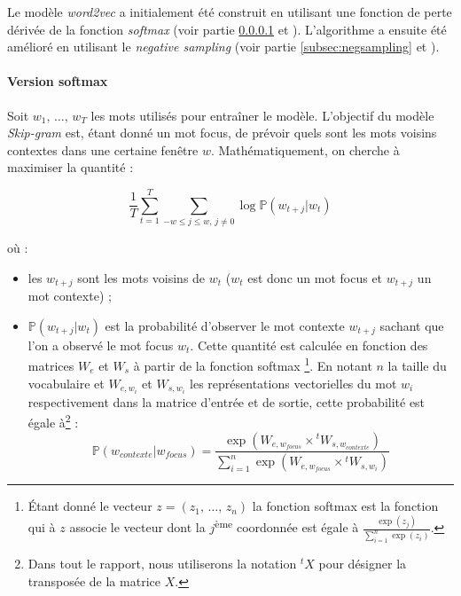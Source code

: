 \documentclass[11pt,french,french]{article}
\let\rmarkdownfootnote\footnote%
\def\footnote{\protect\rmarkdownfootnote}
\begin{document}
Le modèle \emph{word2vec} a initialement été construit en utilisant une
fonction de perte dérivée de la fonction \emph{softmax} (voir partie
\ref{subsec:softmax} et \cite{Mikolov}). L'algorithme a ensuite été
amélioré en utilisant le \emph{negative sampling} (voir partie
\ref{subsec:negsampling} et \cite{MikolovNS}).

\paragraph{Version softmax}\label{subsec:softmax}

Soit \(w_1,\,\dots,\,w_T\) les mots utilisés pour entraîner le modèle.
L'objectif du modèle \emph{Skip-gram} est, étant donné un mot focus, de
prévoir quels sont les mots voisins contextes dans une certaine fenêtre
\(w\). Mathématiquement, on cherche à maximiser la quantité :

\begin{equation}
\frac 1 T\sum_{t=1}^T\sum_{-w\leq j \leq w,\,j\ne 0} \log \mathbb P(w_{t+j}\vert w_{t})
\label{eq:objSoftMax}
\end{equation}

où :

\begin{itemize}
\item
  les \(w_{t+j}\) sont les mots voisins de \(w_t\) (\(w_t\) est donc un
  mot focus et \(w_{t+j}\) un mot contexte) ;
\item
  \(\mathbb P(w_{t+j}\vert w_{t})\) est la probabilité d'observer le mot
  contexte \(w_{t+j}\) sachant que l'on a observé le mot focus \(w_t\).
  Cette quantité est calculée en fonction des matrices \(W_e\) et
  \(W_s\) à partir de la fonction softmax \footnote{Étant donné le
    vecteur \(z=(z_1,\,\dots,\,z_n)\) la fonction softmax est la
    fonction qui à \(z\) associe le vecteur dont la
    \(j\)\textsuperscript{ème} coordonnée est égale à
    \(\frac{\exp(z_j)}{\sum_{i=1}^n\exp(z_i)}\).}. En notant \(n\) la
  taille du vocabulaire et \(W_{e,w_i}\) et \(W_{s,w_i}\) les
  représentations vectorielles du mot \(w_i\) respectivement dans la
  matrice d'entrée et de sortie, cette probabilité est égale à\footnote{Dans
    tout le rapport, nous utiliserons la notation \(^{t}X\) pour
    désigner la transposée de la matrice \(X\).} : \[
  \mathbb P(w_{contexte}\vert w_{focus}) = 
  \frac{
  \exp(W_{e,w_{focus}}\times {}^tW_{s,w_{contexte}})
  }{
  \sum_{i=1}^n\exp(W_{e,w_{focus}}\times {}^tW_{s,w_{i}})
  }
  \]
\end{itemize}
\end{document}
